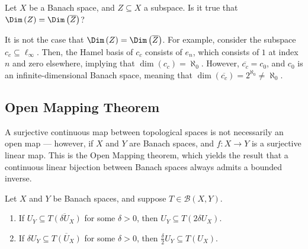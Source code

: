 \documentclass[10pt]{mypackage}
\begin{document}
\begin{exercise}
  Let $X$ be a Banach space, and $Z\subseteq X$ a subspace. Is it true that $\Dim\left(Z\right) = \Dim\left(\overline{Z}\right)$?
\end{exercise}
\begin{solution}
  It is not the case that $\Dim\left(Z\right) = \Dim\left(\overline{Z}\right)$. For example, consider the subspace $c_c\subseteq \ell_{\infty}$. Then, the Hamel basis of $c_c$ consists of $e_n$, which consists of $1$ at index $n$ and zero elsewhere, implying that $\dim\left(c_c\right) = \aleph_{0}$. However, $\overline{c_c} = c_0$, and $c_0$ is an infinite-dimensional Banach space, meaning that $\dim\left(\overline{c_c}\right) = 2^{\aleph_0}\neq \aleph_{0}$.
\end{solution}
\subsection{Open Mapping Theorem}%
A surjective continuous map between topological spaces is not necessarily an open map --- however, if $X$ and $Y$ are Banach spaces, and $f:X\rightarrow Y$ is a surjective linear map. This is the Open Mapping theorem, which yields the result that a continuous linear bijection between Banach spaces always admits a bounded inverse.
  \begin{lemma}
    Let $X$ and $Y$ be Banach spaces, and suppose $T\in \mathcal{B}\left(X,Y\right)$. 
    \begin{enumerate}[(1)]
      \item If $U_Y \subseteq \overline{T\left(\delta U_X\right)}$ for some $\delta > 0$, then $U_Y\subseteq T\left(2\delta U_X\right)$.
      \item If $\delta U_Y\subseteq \overline{T\left(U_X\right)}$ for some $\delta > 0$, then $\frac{\delta}{2}U_Y\subseteq T\left(U_X\right)$.
    \end{enumerate}
  \end{lemma}
\end{document}

